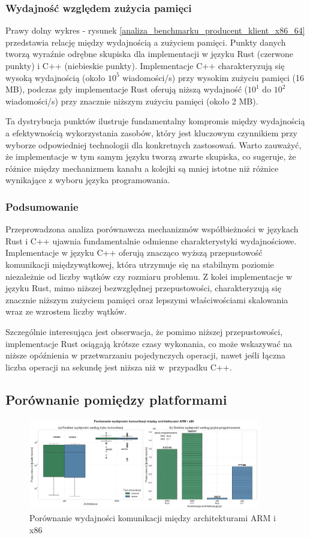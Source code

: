 \subsubsection{Wydajność względem zużycia pamięci}
Prawy dolny wykres - rysunek \ref{analiza_benchmarku_producent_klient_x86_64} przedstawia relację między wydajnością a zużyciem pamięci. Punkty danych tworzą wyraźnie odrębne skupiska dla implementacji w języku Rust (czerwone punkty) i C++ (niebieskie punkty). Implementacje C++ charakteryzują się wysoką wydajnością (około $10^5$ wiadomości/s) przy wysokim zużyciu pamięci (16 MB), podczas gdy implementacje Rust oferują niższą wydajność ($10^1$ do $10^2$ wiadomości/s) przy znacznie niższym zużyciu pamięci (około 2 MB).

Ta dystrybucja punktów ilustruje fundamentalny kompromis między wydajnością a efektywnością wykorzystania zasobów, który jest kluczowym czynnikiem przy wyborze odpowiedniej technologii dla konkretnych zastosowań. Warto zauważyć, że implementacje w tym samym języku tworzą zwarte skupiska, co sugeruje, że różnice między mechanizmem kanału a kolejki są mniej istotne niż różnice wynikające z wyboru języka programowania.

\subsubsection{Podsumowanie}
Przeprowadzona analiza porównawcza mechanizmów współbieżności w językach Rust i C++ ujawnia fundamentalnie odmienne charakterystyki wydajnościowe. Implementacje w języku C++ oferują znacząco wyższą przepustowość komunikacji międzywątkowej, która utrzymuje się na stabilnym poziomie niezależnie od liczby wątków czy rozmiaru problemu. Z kolei implementacje w języku Rust, mimo niższej bezwzględnej przepustowości, charakteryzują się znacznie niższym zużyciem pamięci oraz lepszymi właściwościami skalowania wraz ze wzrostem liczby wątków.

Szczególnie interesująca jest obserwacja, że pomimo niższej przepustowości, implementacje Rust osiągają krótsze czasy wykonania, co może wskazywać na niższe opóźnienia w przetwarzaniu pojedynczych operacji, nawet jeśli łączna liczba operacji na sekundę jest niższa niż w~przypadku C++.

\subsection{Porównanie pomiędzy platformami}
\begin{figure}[H]
    \centering
    \includegraphics[width=0.9\textwidth]{analiza/images/conc/pc/compare/rysunek_1_porownanie_wydajnosci.png}
    \caption{Porównanie wydajności komunikacji między architekturami ARM i x86}
    \label{rysunek_1_porownanie_wydajnosci}
\end{figure}
